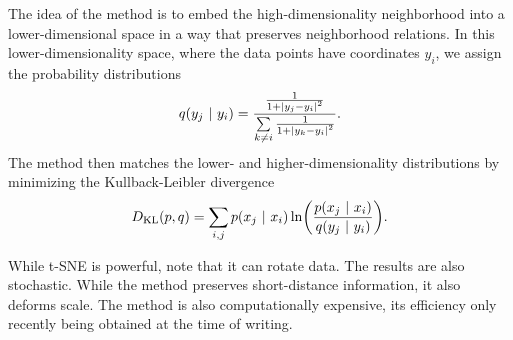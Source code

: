 The idea of the method is to embed the high-dimensionality neighborhood into a lower-dimensional space in a way that preserves neighborhood relations. In this lower-dimensionality space, where the data points have coordinates $y_{i}$, we assign the probability distributions
\begin{align*}
	q(y_{j}\ \vert\  y_{i}) = \frac{\frac{1}{1 + \abs{y_{j} - y_{i}}^{2}}}{\sum\limits_{k\neq i}\frac{1}{1 + \abs{y_{k} - y_{i}}^{2}}}.
\end{align*}
The method then matches the lower- and higher-dimensionality distributions by minimizing the Kullback-Leibler divergence
\begin{align*}
	D_{\text{KL}}(p, q) = \sum\limits_{i, j}p(x_{j}\ \vert\  x_{i})\ln(\frac{p(x_{j}\ \vert\  x_{i})}{q(y_{j}\ \vert\  y_{i})}).
\end{align*}

While t-SNE is powerful, note that it can rotate data. The results are also stochastic. While the method preserves short-distance information, it also deforms scale. The method is also computationally expensive, its efficiency only recently being obtained at the time of writing.